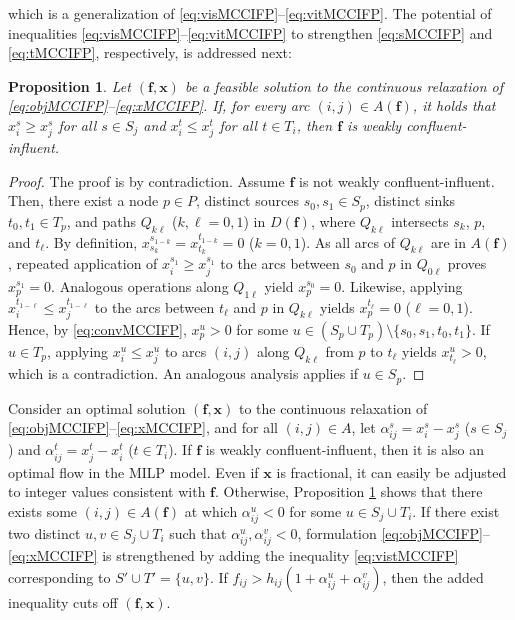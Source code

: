\documentclass[pdflatex,sn-mathphys-num]{sn-jnl}%
\theoremstyle{thmstyleone}%
\newtheorem{proposition}[theorem]{Proposition}%
\begin{document}
\noindent
which is a generalization of \eqref{eq:visMCCIFP}--\eqref{eq:vitMCCIFP}.
The potential of inequalities \eqref{eq:visMCCIFP}--\eqref{eq:vitMCCIFP} to strengthen \eqref{eq:sMCCIFP} and \eqref{eq:tMCCIFP}, respectively, is addressed next:
\begin{proposition} \label{prop:strong}
Let $(\boldsymbol{f},\boldsymbol{x})$ be a feasible solution to the continuous relaxation of \eqref{eq:objMCCIFP}--\eqref{eq:xMCCIFP}.
If, for every arc $(i,j)\in A(\boldsymbol{f})$, it holds that $x_i^s\geq x_j^s$ for all $s\in S_j$ and $x_i^t\leq x_j^t$ for all $t\in T_i$,
then $\boldsymbol{f}$ is weakly confluent-influent.
\end{proposition}
\begin{proof}
The proof is by contradiction.
Assume $\boldsymbol{f}$ is not weakly confluent-influent. Then, there exist a node $p\in P$,
distinct sources $s_0,s_1\in S_p$, distinct sinks $t_0,t_1\in T_p$, and paths $Q_{k\ell}$ ($k,\ell=0,1$) in $D(\boldsymbol{f})$,
where $Q_{k\ell}$ intersects $s_k$, $p$, and $t_{\ell}$.
By definition, $x_{s_k}^{s_{1-k}}=x_{t_k}^{t_{1-k}}=0$ ($k=0,1$).
As all arcs of $Q_{k\ell}$ are in $A(\boldsymbol{f})$, repeated application of $x_i^{s_1}\geq x_j^{s_1}$ to the arcs between $s_0$ and $p$ in $Q_{0\ell}$
proves $x_p^{s_1}=0$. Analogous operations along $Q_{1\ell}$ yield $x_p^{s_0}=0$.
Likewise, applying $x_i^{t_{1-\ell}}\leq x_j^{t_{1-\ell}}$ to the arcs between $t_{\ell}$ and $p$ in $Q_{k\ell}$ yields $x_p^{t_{\ell}}=0$ ($\ell=0,1$).
Hence, by \eqref{eq:convMCCIFP}, $x_p^u>0$ for some $u\in (S_p\cup T_p)\setminus\{s_0,s_1,t_0,t_1\}$.
If $u\in T_p$, applying $x_i^u\leq x_j^u$ to arcs $(i,j)$ along $Q_{k\ell}$ from $p$ to $t_{\ell}$ yields $x_{t_{\ell}}^u>0$, which is a contradiction.
An analogous analysis applies if $u\in S_p$.
\end{proof}

Consider an optimal solution $(\boldsymbol{f},\boldsymbol{x})$ to the continuous relaxation of \eqref{eq:objMCCIFP}--\eqref{eq:xMCCIFP},
and for all $(i,j)\in A$, let $\alpha_{ij}^s=x_i^s-x_j^s$ ($s\in S_j$) and $\alpha_{ij}^t=x_j^t-x_i^t$ ($t\in T_i$).
If $\boldsymbol{f}$ is weakly confluent-influent, then it is also an optimal flow in the MILP model.
Even if $\boldsymbol{x}$ is fractional, it can easily be adjusted to integer values consistent with $\boldsymbol{f}$.
Otherwise, Proposition \ref{prop:strong} shows that there exists some $(i,j)\in A(\boldsymbol{f})$ at which $\alpha_{ij}^u<0$ for some $u\in S_j\cup T_i$.
If there exist two distinct $u,v\in S_j\cup T_i$ such that $\alpha_{ij}^u,\alpha_{ij}^v<0$,
formulation \eqref{eq:objMCCIFP}--\eqref{eq:xMCCIFP} is strengthened by adding the inequality \eqref{eq:vistMCCIFP} corresponding to $S'\cup T'=\{u,v\}$.
If $f_{ij}>h_{ij}\left(1+\alpha_{ij}^u+\alpha_{ij}^v\right)$, then the added inequality cuts off $(\boldsymbol{f},\boldsymbol{x})$.
\end{document}
